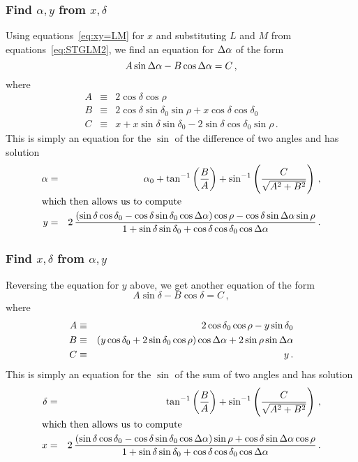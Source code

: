 \subsubsection{Find $\alpha,y$ from $x,\delta$}

     Using equations~\ref{eq:xy=LM} for $x$ and substituting $L$ and
$M$ from equations~\ref{eq:STGLM2}, we find an equation for
$\Delta\alpha$ of the form
\begin{displaymath}
  A\sin\Delta\alpha - B\cos\Delta\alpha = C \, ,
\end{displaymath}
where
\begin{eqnarray*}
   A & \equiv &2\cos\delta\cos\rho \\
   B & \equiv &2\cos\delta\sin\delta_0\sin\rho +
                   x\cos\delta\cos\delta_0 \\
   C & \equiv &x + x\sin\delta\sin\delta_0 -
                 2\sin\delta\cos\delta_0\sin\rho \, .
\end{eqnarray*}
This is simply an equation for the $\sin$ of the difference of two
angles and has solution
\begin{eqnarray*}
   \alpha & = &\alpha_0 + \tan^{-1}\left(\frac{B}{A}\right) +
                  \sin^{-1}\left(\frac{C}{\strut\sqrt{A^2+B^2}}
                  \right) \, , \\
\noalign{\hbox{which then allows us to compute}\vskip 1pt}
   y & = &2\,\frac{(\sin\delta\cos\delta_0 - \cos\delta\sin\delta_0
            \cos\da)\cos\rho - \cos\delta\sin\da\sin\rho}{1 + \sin
            \delta\sin\delta_0 + \cos\delta\cos\delta_0\cos\da} \, .
\end{eqnarray*}

\subsubsection{Find $x,\delta$ from $\alpha,y$}

     Reversing the equation for $y$ above, we get another equation of
the form
\begin{displaymath}
  A\sin\delta - B\cos\delta = C \, ,
\end{displaymath}
where
\begin{eqnarray*}
   A & \equiv &2\cos\delta_0\cos\rho - y\sin\delta_0 \\
   B & \equiv &\left( y\cos\delta_0+2\sin\delta_0\cos\rho \right)
                 \cos\Delta\alpha + 2\sin\rho\sin\Delta\alpha \\
   C & \equiv &y \, .
\end{eqnarray*}
This is simply an equation for the $\sin$ of the sum of two angles and
has solution
\begin{eqnarray*}
   \delta & = &\tan^{-1}\left(\frac{B}{A}\right) + \sin^{-1}\left(
                 \frac{C}{\strut\sqrt{A^2+B^2}}\right) \, , \\
\noalign{\hbox{which then allows us to compute}\vskip 1pt}
   x & = &2\,\frac{(\sin\delta\cos\delta_0-\cos\delta\sin\delta_0
            \cos\da)\sin\rho + \cos\delta\sin\da\cos\rho}{1 +
            \sin\delta\sin\delta_0 + \cos\delta\cos\delta_0\cos\da} \, .
\end{eqnarray*}

